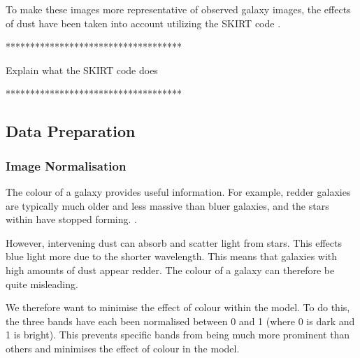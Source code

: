 \documentclass[12pt, onecolumn]{article}
\begin{document}
        To make these images more representative of observed galaxy images, the effects of dust have been taken into account utilizing the SKIRT code \cite{trayford}.

        \vspace{5mm}
        ************************************
        
        Explain what the SKIRT code does

        ************************************
    
        
        \subsection{Data Preparation}
        
        \subsubsection{Image Normalisation}
        

            The colour of a galaxy provides useful information. For example, redder galaxies are typically much older and less massive than bluer galaxies, and the stars within have stopped forming. \cite{elliptical_red_low_sfr}.

            However, intervening dust can absorb and scatter light from stars. This effects blue light more due to the shorter wavelength. This means that galaxies with high amounts of dust appear redder. The colour of a galaxy can therefore be quite misleading.

            We therefore want to minimise the effect of colour within the model. To do this, the three bands have each been normalised between 0 and 1 (where 0 is dark and 1 is bright). This prevents specific bands from being much more prominent than others and minimises the effect of colour in the model.

            
    
\end{document}
